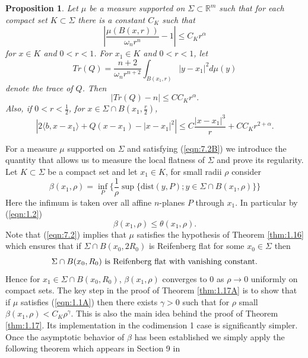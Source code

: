 \documentclass[12pt,leqno]{article}
\newcommand{\RR}{\mathbb{R}}
\newcommand{\dist}{\mathrm{dist}}
\theoremstyle{plain}
\newtheorem{prop}[thm]{Proposition}
{\theorembodyfont{\rmfamily}
\newtheorem{defn}[thm]{Definition}}
{\theorembodyfont{\rmfamily}
\newtheorem{rem}[thm]{Remark}}
\numberwithin{equation}{section}
\begin{document}
\begin{prop}\label{prop:7.6}
Let $\mu$ be a measure supported on $\Sigma\subset\RR^m$ such that
for each compact set $K\subset\Sigma$ there is
a constant $C_K$ such that
\begin{equation}\label{eqn:7.2B}
\left|\frac{\mu(B(x,r))}{\omega_nr^n}-1\right|\le C_Kr^\alpha
\end{equation}
for $x\in K$ and $0<r<1$. For $x_1\in K$ and $0<r<1$, let
\begin{equation}\label{eqn:7.7}
Tr(Q)=\frac{n+2}{\omega_nr^{n+2}}\int_{B(x_1,r)}|y-x_1|^2d\mu(y)
\end{equation}
denote the trace of $Q$. Then
\begin{equation}\label{eqn:7.8}
|Tr(Q)-n|\le CC_Kr^\alpha.
\end{equation}
Also, if $0<r<\frac{1}{2}$, for $x\in\Sigma\cap
B\left(x_1,\frac{r}{2}\right)$,
\begin{equation}
\label{eqn:7.9}
\left|2\langle b, x-x_1\rangle+Q(x-x_1)-|x-x_1|^2\right|\le C
\frac{|x-x_1|^3}{r}+CC_Kr^{2+\alpha}.
\end{equation}
\end{prop}

For a measure $\mu$ supported on $\Sigma$ and satisfying (\ref{eqn:7.2B})
we introduce the quantity that allows us to measure the local flatness
of $\Sigma$
and prove its regularity.
Let $K\subset\Sigma$ be a compact set and let $x_1\in K$, for small radii
$\rho$ consider
\begin{equation}\label{eqn:8.1}
\beta(x_1,\rho) = \inf_P\{\frac{1}{\rho}\sup\{\dist(y,P); y\in\Sigma\cap
B(x_1,\rho)\}\}
\end{equation}
Here the infimum is taken over all affine $n$-planes $P$ through $x_1$.
In particular by (\ref{eqn:1.2})
\[
\beta(x_1,\rho)\le \theta(x_1,\rho).
\]
Note that (\ref{eqn:7.2}) implies that $\mu$
satisfies the hypothesis of
Theorem \ref{thm:1.16} which ensures that if $\Sigma\cap B(x_0, 2R_0)$ is
Reifenberg flat for some $x_0\in \Sigma$ then
\begin{equation}\label{eqn:8.2}
\Sigma\cap B(x_0, R_0)\hbox{ is Reifenberg flat with vanishing constant.}
\end{equation}
Hence for $x_1\in \Sigma\cap B(x_0, R_0)$, $\beta(x_1,\rho)$
converges to $0$ as $\rho\rightarrow 0$ uniformly on
compact sets. The key step in the proof of Theorem
\ref{thm:1.17A} is to show that if $\mu$ satisfies (\ref{eqn:1.1A}) then
there exists $\gamma>0$ such that for $\rho$ small
$\beta(x_1,\rho)<C_K \rho^{\gamma}$. This is also the main idea behind
the proof of Theorem \ref{thm:1.17}. Its implementation in the codimension
1 case is significantly simpler. Once the asymptotic behavior of $\beta$ has
been established we simply apply the following theorem which appears in
Section 9 in \cite{DKT}
\end{document}
